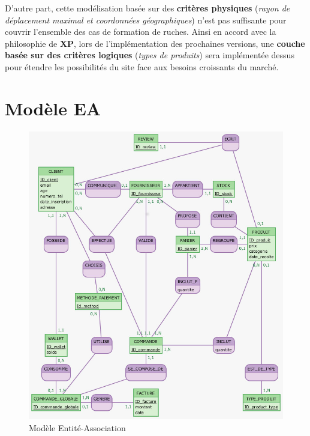 \documentclass[a4paper,12pt]{book}
\theoremstyle{break}
\theoremstyle{break}
\theoremstyle{break}
\theoremstyle{break}
\theoremstyle{definition}
\theoremstyle{remark}
\begin{document}
D'autre part, cette modélisation basée sur des \textbf{critères physiques} (\textit{rayon de déplacement maximal et coordonnées géographiques}) n'est pas suffisante pour couvrir l'ensemble des cas de formation de ruches. Ainsi en accord avec la philosophie de \textbf{XP}, lors de l'implémentation des prochaines versions, une \textbf{couche basée sur des critères logiques} (\textit{types de produits}) sera implémentée dessus pour étendre les possibilités du site face aux besoins croissants du marché.
\section{Modèle EA}
\begin{figure}[!ht]
  \centering
  \includegraphics[scale=0.6]{images/Clients.jpg}
  \caption{Modèle Entité-Association}
  \label{fig:modele_EA}
\end{figure}

\newpage
\end{document}
